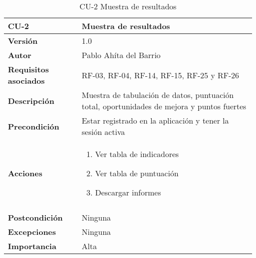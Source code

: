 \begin{table}[p]
	\centering
	\begin{tabularx}{\linewidth}{ p{} p{} }
		\toprule
		\textbf{CU-2}    & \textbf{Muestra de resultados}\\
		\toprule
		\textbf{Versión}              & 1.0    \\
		\textbf{Autor}                & Pablo Ahíta del Barrio \\
		\textbf{Requisitos asociados} & RF-03, RF-04, RF-14, RF-15, RF-25 y RF-26 \\
		\textbf{Descripción}          & Muestra de tabulación de datos, puntuación total, oportunidades de mejora y puntos fuertes\\
		\textbf{Precondición}         & Estar registrado en la aplicación y tener la sesión activa \\
		\textbf{Acciones}             &
		\begin{enumerate}
			\def\labelenumi{\arabic{enumi}.}
			\tightlist
			\item Ver tabla de indicadores
			\item Ver tabla de puntuación
			\item Descargar informes
		\end{enumerate}\\
		\\
		\textbf{Postcondición}        & Ninguna \\
		\textbf{Excepciones}          & Ninguna \\
		\textbf{Importancia}          & Alta \\
		\bottomrule
	\end{tabularx}
	\caption{CU-2 Muestra de resultados}
\end{table}

